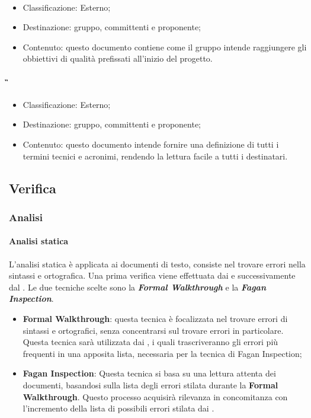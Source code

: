 			\paragraph{\PdQ}
				\begin{itemize}
					\item Classificazione: Esterno;
					\item Destinazione: gruppo, committenti e proponente;
					\item Contenuto: questo documento contiene come il gruppo intende raggiungere gli obbiettivi di qualità prefissati all’inizio del progetto.
				\end{itemize}
			\paragraph{\G}
				\begin{itemize}
					\item Classificazione: Esterno;
					\item Destinazione: gruppo, committenti e proponente;
					\item Contenuto: questo documento intende fornire una definizione di tutti i termini tecnici e acronimi, rendendo la lettura facile a tutti i destinatari.
				\end{itemize}
	\subsection{Verifica}
		\subsubsection{Analisi}
			\paragraph{Analisi statica}
				L'analisi statica è applicata ai documenti di testo, consiste nel trovare errori nella sintassi e ortografica. Una prima verifica viene effettuata dai \textit{\Vers} e successivamente dal \textit{\RdP}. Le due tecniche scelte sono la \textbf{\textit{Formal Walkthrough}} e la \textbf{\textit{Fagan Inspection}}.
				\begin{itemize}
					\item \textbf{Formal Walkthrough}: questa tecnica è focalizzata nel trovare errori di sintassi e ortografici, senza concentrarsi sul trovare errori in particolare. Questa tecnica sarà utilizzata dai \textit{\Vers}, i quali trascriveranno gli errori più frequenti in una apposita lista, necessaria per la tecnica di Fagan Inspection;
					\item \textbf{Fagan Inspection}: Questa tecnica si basa su una lettura attenta dei documenti, basandosi sulla lista degli errori stilata durante la \textbf{Formal Walkthrough}. Questo processo acquisirà rilevanza in concomitanza con l'incremento della lista di possibili errori stilata dai \textit{\Vers}.
				\end{itemize}
				
